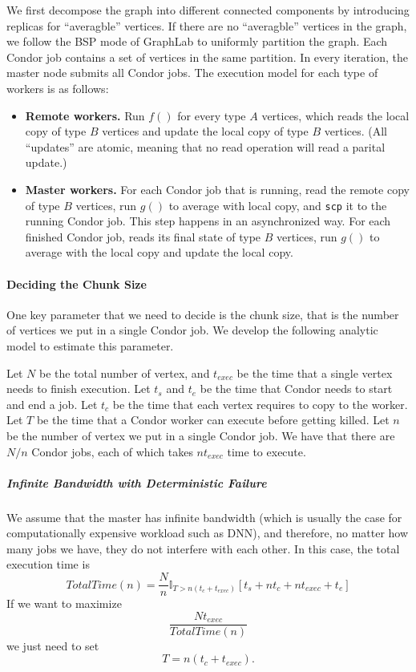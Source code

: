 \documentclass[11pt]{article}
\begin{document}
We first decompose the graph into different connected components by introducing 
replicas for ``averagble'' vertices.
If there are no ``averagble'' vertices in the graph, we follow the BSP mode of 
GraphLab to uniformly partition the graph.
Each Condor job contains a set of vertices in the same partition.
In every iteration, the master node submits all Condor jobs.
The execution model for each type of workers is as follows:

\begin{itemize}
\item \textbf{Remote workers.} Run $f()$ for every type $A$ vertices, which reads the local copy of type $B$ 
vertices and update the local copy of type $B$ vertices. (All “updates” are 
atomic, meaning that no read operation will read a parital update.)
\item \textbf{Master workers.} For each Condor job that is running, read the remote copy of type $B$ vertices, 
run $g()$ to average with local copy, and \texttt{scp} it to the running Condor job. 
This step happens in an asynchronized way. For each finished Condor job, reads 
its final state of type $B$ vertices, run $g()$ to average with the local copy 
and update the local copy.
\end{itemize}

\paragraph*{Deciding the Chunk Size}

One key parameter that we need to decide is the
chunk size, that is the number of vertices we
put in a single Condor job. We develop the following
analytic model to estimate this parameter. 

Let $N$ be the total number of vertex, and $t_{exec}$
be the time that a single vertex needs to
finish execution. Let $t_s$ and $t_e$ be the time
that Condor needs to start and end a job. Let
$t_c$ be the time that each vertex requires to copy
to the worker.
Let $T$ be the time that a Condor worker can execute
before getting killed. Let $n$ be the number of 
vertex we put in a single Condor job.
%
We have that there are $N/n$ Condor jobs, each of which
takes $nt_{exec}$ time to execute. 

\subparagraph*{Infinite Bandwidth with Deterministic Failure}

We assume that the master has infinite bandwidth (which
is usually the case for computationally expensive
workload such as DNN),
and therefore, no matter how many jobs we have, they
do not interfere with each other. In this case, the
total execution time is
\[
TotalTime(n) = \frac{N}{n} \mathbb{I}_{T>n(t_c+t_{exec})} \left[ t_s + nt_c + nt_{exec}  + t_e \right]
\]
If we want to maximize
\[
\frac{Nt_{exec}}{TotalTime(n)}
\]
we just need to set
\[
T=n(t_c+t_{exec}).
\]
\end{document}
